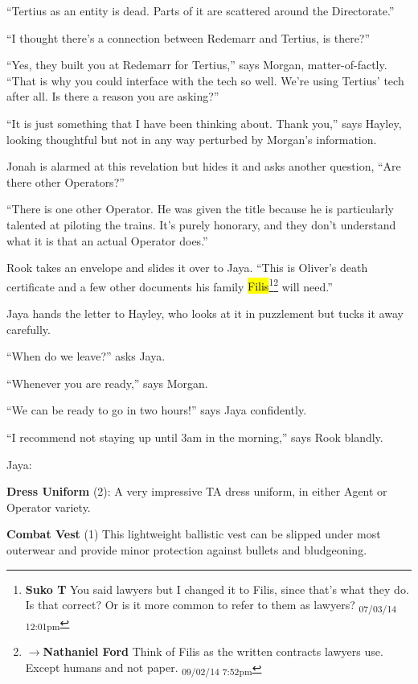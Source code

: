 ``Tertius as an entity is dead.  Parts of it are scattered around the Directorate.''

``I thought there's a connection between Redemarr and Tertius, is there?''

``Yes, they built you at Redemarr for Tertius,'' says Morgan, matter-of-factly.  ``That is why you could interface with the tech so well.  We're using Tertius' tech after all.  Is there a reason you are asking?''

``It is just something that I have been thinking about.  Thank you,'' says Hayley, looking thoughtful but not in any way perturbed by Morgan's information.

Jonah is alarmed at this revelation but hides it and asks another question, ``Are there other Operators?''

``There is one other Operator.  He was given the title because he is particularly talented at piloting the trains.  It's purely honorary, and they don't understand what it is that an actual Operator does.''

Rook takes an envelope and slides it over to Jaya.  ``This is Oliver's death certificate and a few other documents his family \hl{Filis}\footnote{\textbf{Suko T }You said lawyers but I changed it to Filis, since that's what they do.  Is that correct?  Or is it more common to refer to them as lawyers? \textsubscript{07/03/14 12:01pm}}\footnote{$\rightarrow$\textbf{Nathaniel Ford }Think of Filis as the written contracts lawyers use. Except humans and not paper. \textsubscript{09/02/14 7:52pm}} will need.''

Jaya hands the letter to Hayley, who looks at it in puzzlement but tucks it away carefully.

``When do we leave?'' asks Jaya.

``Whenever you are ready,'' says Morgan.

``We can be ready to go in two hours!'' says Jaya confidently.

``I recommend not staying up until 3am in the morning,'' says Rook blandly.





Jaya:

\textbf{Dress Uniform} (2): A very impressive TA dress uniform, in either Agent or Operator variety.

\textbf{Combat Vest} (1) This lightweight ballistic vest can be slipped under most outerwear and provide minor protection against bullets and bludgeoning.

